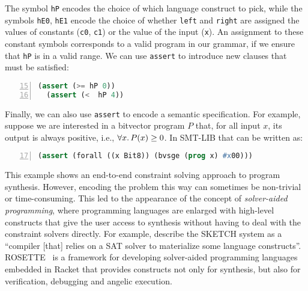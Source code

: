 %
The symbol \texttt{hP} encodes the choice of which language construct to pick,
while the symbols \texttt{hE0}, \texttt{hE1} encode the choice of whether
\texttt{left} and \texttt{right} are assigned the values of constants
(\texttt{c0}, \texttt{c1}) or the value of the input (\texttt{x}).
An assignment to these constant symbols corresponds to a valid program in our
grammar, if we ensure that \texttt{hP} is in a valid range.
We can use \texttt{assert} to introduce new clauses that must be satisfied:
%
\begin{lstlisting}[language=Lisp,
  numbers=left,
  firstnumber=15,
  morekeywords={assert},
  xleftmargin=.2\textwidth, xrightmargin=.2\textwidth]
  (assert (>= hP 0))
  (assert (<  hP 4))
\end{lstlisting}
%
Finally, we can also use \texttt{assert} to encode a semantic specification.
For example, suppose we are interested in a bitvector program $P$ that, for all
input $x$, its output is always positive, i.e., $\forall x\ldotp P(x) \geq 0$.
In SMT-LIB that can be written as:
%
\begin{lstlisting}[language=Lisp,
  numbers=left,
  firstnumber=17,
  morekeywords={assert},
  xleftmargin=.2\textwidth, xrightmargin=.2\textwidth]
  (assert (forall ((x Bit8)) (bvsge (prog x) #x00)))
\end{lstlisting}
 
This example shows an end-to-end constraint solving approach to program
synthesis. However, encoding the problem this way can sometimes be non-trivial
or time-consuming.
This led to the appearance of the concept of \textit{solver-aided programming},
where programming languages are enlarged with high-level constructs that give
the user access to synthesis without having to deal with the constraint solvers
directly.
For example, \citeauthor{Gulwani2017} describe the SKETCH system as a ``compiler
[that] relies on a SAT solver to materialize some language constructs''.
ROSETTE~\cite{Torlak:2013:GSL} is a framework for developing solver-aided
programming languages embedded in Racket that provides constructs not only for
synthesis, but also for verification, debugging and angelic execution.
